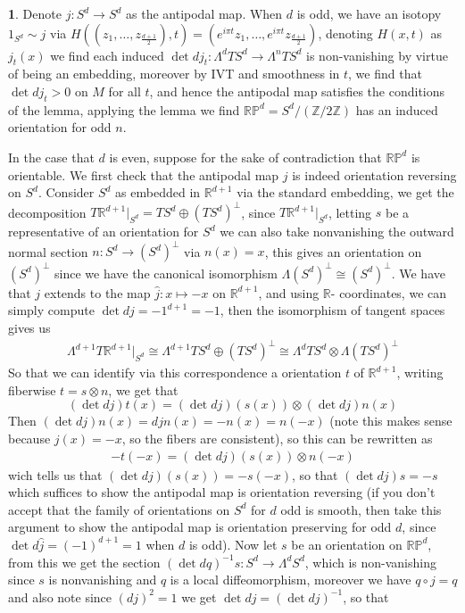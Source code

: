 \documentclass[10.5pt]{article}
\theoremstyle{definition}
\newtheorem{pb}{}
\begin{document}
\begin{pb}
        Denote \(j:S^d \to S^d\) as the antipodal map. When \(d\) is odd, we have an isotopy \(1_{S^d} \sim j\) via \(H((z_1,\hdots,z_{\frac{d+1}{2}}),t) = (e^{i\pi t}z_1,\hdots,e^{i\pi t}z_{\frac{d+1}{2}})\), denoting \(H(x,t)\) as \(j_t(x)\) we find each induced \(\det dj_t: \Lambda^d TS^d \to \Lambda^n TS^d\) is non-vanishing by virtue of being an embedding, moreover by IVT and smoothness in \(t\), we find that \(\det dj_t > 0\) on \(M\) for all \(t\), and hence the antipodal map satisfies the conditions of the lemma, applying the lemma we find \(\mathbb{RP}^d = S^d/(\mathbb{Z}/ 2 \mathbb{Z})\) has an induced orientation for odd \(n\).

        In the case that \(d\) is even, suppose for the sake of contradiction that \(\mathbb{RP}^d\) is orientable. We first check that the antipodal map \(j\) is indeed orientation reversing on \(S^d\). Consider \(S^d\) as embedded in \(\mathbb{R}^{d+1}\) via the standard embedding, we get the decomposition \(T \mathbb{R}^{d+1}\vert_{S^d} = TS^d \oplus (TS^d)^\perp\), since \(T \mathbb{R}^{d+1}\vert_{S^d}\), letting \(s\) be a representative of an orientation for \(S^d\)  we can also take nonvanishing the outward normal section \(n: S^d \to (S^d)^\perp\) via \(n(x) = x\), this gives an orientation on \((S^d)^\perp\) since we have the canonical isomorphism \(\Lambda (S^d)^\perp \cong (S^d)^\perp\). We have that \(j\) extends to the map \(\hat{j}: x \mapsto -x\) on \(\mathbb{R}^{d+1}\), and using \(\mathbb{R}\)- coordinates, we can simply compute \(\det dj = -1^{d+1} = -1\), then the isomorphism of tangent spaces gives us
        \begin{align*}
            \Lambda^{d+1} T \mathbb{R}^{d+1}\vert_{S^d} \cong \Lambda^{d+1} TS^d \oplus (TS^d)^\perp \cong \Lambda^d TS^d \otimes \Lambda (TS^d)^\perp
        \end{align*}
        So that we can identify via this correspondence a orientation \(t\) of \(\mathbb{R}^{d+1}\), writing fiberwise \(t = s \otimes n\), we get that 
        \[(\det dj) t (x) = (\det dj)(s(x))\otimes (\det dj)n(x)\]
        Then \((\det dj)n(x) = dj n(x) = -n(x) = n(-x)\) (note this makes sense because \(j(x) = -x\), so the fibers are consistent), so this can be rewritten as
        \begin{align*}
            -t(-x) = (\det dj)(s(x))\otimes n(-x)
        \end{align*}
        wich tells us that \((\det dj)(s(x)) = -s(-x)\), so that \((\det dj) s = -s\) which suffices to show the antipodal map is orientation reversing (if you don't accept that the family of orientations on \(S^d\) for \(d\) odd is smooth, then take this argument to show the antipodal map is orientation preserving for odd \(d\), since \(\det d\hat{j} = (-1)^{d+1} = 1\) when \(d\) is odd). Now let \(s\) be an orientation on \(\mathbb{RP}^d\), from this we get the section \((\det dq)^{-1}s: S^d \to \Lambda^d S^d\), which is non-vanishing since \(s\) is nonvanishing and \(q\) is a local diffeomorphism, moreover we have \(q\circ j = q\) and also note since \((dj)^2 = 1\) we get \(\det dj= (\det dj)^{-1}\), so that 

\end{pb}
\end{document}

